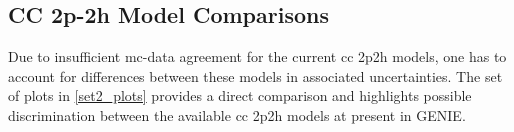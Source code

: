 \vspace{-3mm}
\subsection{CC 2p-2h Model Comparisons} \label{set2} \vspace{-2mm}
Due to insufficient \acrshort{mc}-data agreement for the current \acrshort{cc} \acrshort{2p2h} models, one has to account for differences between these models in associated uncertainties. The set of plots in \cref{set2_plots} provides a direct comparison and highlights possible discrimination between the available \acrshort{cc} \acrshort{2p2h} models at present in GENIE.
